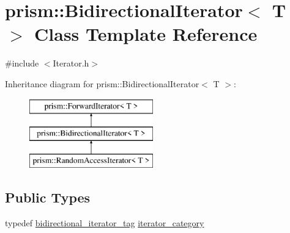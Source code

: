 \hypertarget{classprism_1_1_bidirectional_iterator}{}\section{prism\+:\+:Bidirectional\+Iterator$<$ T $>$ Class Template Reference}
\label{classprism_1_1_bidirectional_iterator}


{\ttfamily \#include $<$Iterator.\+h$>$}

Inheritance diagram for prism\+:\+:Bidirectional\+Iterator$<$ T $>$\+:\begin{figure}[H]
\begin{center}
\leavevmode
\includegraphics[height=3.000000cm]{classprism_1_1_bidirectional_iterator}
\end{center}
\end{figure}
\subsection*{Public Types}
\begin{DoxyCompactItemize}
\item 
typedef \hyperlink{structprism_1_1bidirectional__iterator__tag}{bidirectional\+\_\+iterator\+\_\+tag} \hyperlink{classprism_1_1_bidirectional_iterator_a88ba2497fb00dd276b2cfb799cb61bc2}{iterator\+\_\+category}
\end{DoxyCompactItemize}

